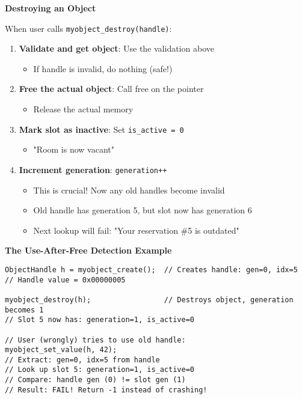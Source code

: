 \textbf{Destroying an Object}

When user calls \texttt{myobject\_destroy(handle)}:

\begin{enumerate}
    \item \textbf{Validate and get object}: Use the validation above
    \begin{itemize}
        \item If handle is invalid, do nothing (safe!)
    \end{itemize}

    \item \textbf{Free the actual object}: Call free on the pointer
    \begin{itemize}
        \item Release the actual memory
    \end{itemize}

    \item \textbf{Mark slot as inactive}: Set \texttt{is\_active = 0}
    \begin{itemize}
        \item "Room is now vacant"
    \end{itemize}

    \item \textbf{Increment generation}: \texttt{generation++}
    \begin{itemize}
        \item This is crucial! Now any old handles become invalid
        \item Old handle has generation 5, but slot now has generation 6
        \item Next lookup will fail: "Your reservation \#5 is outdated"
    \end{itemize}
\end{enumerate}

\textbf{The Use-After-Free Detection Example}

\begin{lstlisting}
ObjectHandle h = myobject_create();  // Creates handle: gen=0, idx=5
// Handle value = 0x00000005

myobject_destroy(h);                 // Destroys object, generation becomes 1
// Slot 5 now has: generation=1, is_active=0

// User (wrongly) tries to use old handle:
myobject_set_value(h, 42);
// Extract: gen=0, idx=5 from handle
// Look up slot 5: generation=1, is_active=0
// Compare: handle gen (0) != slot gen (1)
// Result: FAIL! Return -1 instead of crashing!
\end{lstlisting}

